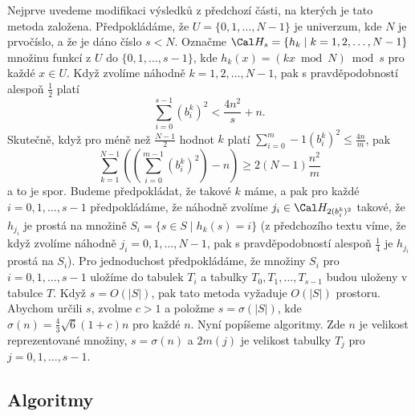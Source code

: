 \documentclass[a4paper,12pt]{article}
\begin{document}
Nejprve uvedeme modifikaci výsledků z 
předchozí části, na kterých je tato metoda založena.
Předpokládáme, že $U=\{0,1,\dots,N-1\}$ je univerzum, kde $
N$ je 
prvočíslo, a že je dáno číslo $s<N$. Označme 
$\Cal H_s=\{h_k\mid k=1,2,\dots,N-1\}$ množinu funkcí z $U$ do 
$\{0,1,\dots,s-1\}$, kde $h_k(x)=(kx\bmod N)\bmod s$ pro každé $
x\in U$. 
Když zvolíme náhodně $k=1,2,\dots,N-1$, pak s pravděpodobností 
ales\-poň $\frac 12$ platí 
$$\sum_{i=0}^{s-1}(b_i^k)^2<\frac {4n^2}s+n.$$
Skutečně, když pro méně než $\frac{N-1}2$ hodnot $k$ platí $\sum_{i=0}^m-1(b^k_i)^2\le\frac{4n}m$, pak 
$$\sum_{k=1}^{N-1}\left((\sum_{i=0}^{m-1}(b^k_i)^2)-n\right)\ge2(N-1)\frac{n^2}m$$ 
a to je spor. Budeme předpokládat, 
že takové $k$ máme, a pak pro každé $i=0,1,\dots,s-1$ 
předpokládáme, že náhodně zvolíme $j_i\in \Cal H_{
2(b_i^k)^2}$ takové, že 
$h_{j_i}$ je prostá na množině $S_i=\{s\in S\mid h_k(s)=i
\}$ (z předchozího textu víme, že když zvolíme náhodně 
$j_i=0,1,\dots,N-1$, pak s pravděpodobností ales\-poň $\frac 
14$ je $h_{j_i}$ prostá na $S_i$). Pro jednoduchost předpokládáme, že množiny $
S_i$ 
pro $i=0,1,\dots,s-1$ uložíme do tabulek $T_i$ a tabulky 
$T_0,T_1,\dots,T_{s-1}$ budou uloženy v tabulce $T$. Když $
s=O(|S|)$, 
pak tato metoda vyžaduje $O(|S|)$ prostoru. Abychom určili $
s$, 
zvolme $c>1$ a položme $s=\sigma (|S|)$, kde $\sigma (n)=\frac 
43\sqrt 6(1+c)n$ pro 
každé $n$. Nyní popíšeme algoritmy. Zde $n$ je velikost reprezentované množiny, $s=\sigma(n)$ a $2m(j)$ je velikost tabulky $T_j$ pro $j=0,1,\dots,s-1$.

\subsection{
Algoritmy
}
\end{document}
